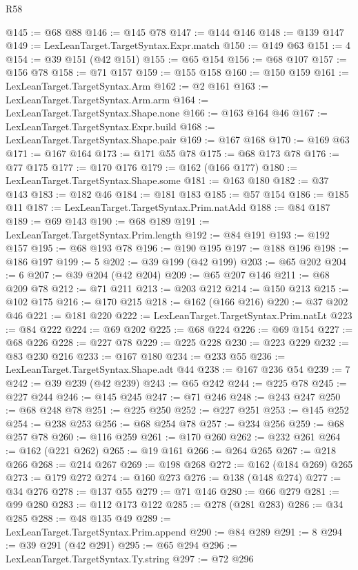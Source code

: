 \begin{lexlean}{R58}
\begin{coremodule}
@145 := @68 @88
@146 := @145 @78
@147 := @144 @146
@148 := @139 @147
@149 := LexLeanTarget.TargetSyntax.Expr.match
@150 := @149 @63
@151 := 4
@154 := @39 @151 (@42 @151)
@155 := @65 @154
@156 := @68 @107
@157 := @156 @78
@158 := @71 @157
@159 := @155 @158
@160 := @150 @159
@161 := LexLeanTarget.TargetSyntax.Arm
@162 := @2 @161
@163 := LexLeanTarget.TargetSyntax.Arm.arm
@164 := LexLeanTarget.TargetSyntax.Shape.none
@166 := @163 @164 @46
@167 := LexLeanTarget.TargetSyntax.Expr.build
@168 := LexLeanTarget.TargetSyntax.Shape.pair
@169 := @167 @168
@170 := @169 @63
@171 := @167 @164
@173 := @171 @55 @78
@175 := @68 @173 @78
@176 := @77 @175
@177 := @170 @176
@179 := @162 (@166 @177)
@180 := LexLeanTarget.TargetSyntax.Shape.some
@181 := @163 @180
@182 := @37 @143
@183 := @182 @46
@184 := @181 @183
@185 := @57 @154
@186 := @185 @11
@187 := LexLeanTarget.TargetSyntax.Prim.natAdd
@188 := @84 @187
@189 := @69 @143
@190 := @68 @189
@191 := LexLeanTarget.TargetSyntax.Prim.length
@192 := @84 @191
@193 := @192 @157
@195 := @68 @193 @78
@196 := @190 @195
@197 := @188 @196
@198 := @186 @197
@199 := 5
@202 := @39 @199 (@42 @199)
@203 := @65 @202
@204 := 6
@207 := @39 @204 (@42 @204)
@209 := @65 @207 @146
@211 := @68 @209 @78
@212 := @71 @211
@213 := @203 @212
@214 := @150 @213
@215 := @102 @175
@216 := @170 @215
@218 := @162 (@166 @216)
@220 := @37 @202 @46
@221 := @181 @220
@222 := LexLeanTarget.TargetSyntax.Prim.natLt
@223 := @84 @222
@224 := @69 @202
@225 := @68 @224
@226 := @69 @154
@227 := @68 @226
@228 := @227 @78
@229 := @225 @228
@230 := @223 @229
@232 := @83 @230 @216
@233 := @167 @180
@234 := @233 @55
@236 := LexLeanTarget.TargetSyntax.Shape.adt @44
@238 := @167 @236 @54
@239 := 7
@242 := @39 @239 (@42 @239)
@243 := @65 @242
@244 := @225 @78
@245 := @227 @244
@246 := @145 @245
@247 := @71 @246
@248 := @243 @247
@250 := @68 @248 @78
@251 := @225 @250
@252 := @227 @251
@253 := @145 @252
@254 := @238 @253
@256 := @68 @254 @78
@257 := @234 @256
@259 := @68 @257 @78
@260 := @116 @259
@261 := @170 @260
@262 := @232 @261
@264 := @162 (@221 @262)
@265 := @19 @161
@266 := @264 @265
@267 := @218 @266
@268 := @214 @267
@269 := @198 @268
@272 := @162 (@184 @269) @265
@273 := @179 @272
@274 := @160 @273
@276 := @138 (@148 @274)
@277 := @34 @276
@278 := @137 @55
@279 := @71 @146
@280 := @66 @279
@281 := @99 @280
@283 := @112 @173 @122
@285 := @278 (@281 @283)
@286 := @34 @285
@288 := @48 @135 @49
@289 := LexLeanTarget.TargetSyntax.Prim.append
@290 := @84 @289
@291 := 8
@294 := @39 @291 (@42 @291)
@295 := @65 @294
@296 := LexLeanTarget.TargetSyntax.Ty.string
@297 := @72 @296

\end{coremodule}
\end{lexlean}
